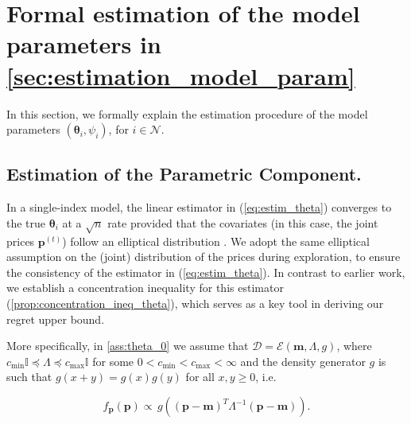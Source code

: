 \documentclass{article} %
\def\eqref#1{equation~\ref{#1}}
\renewcommand{\eqref}[1]{(\ref{#1})}
\begin{document}
\section{Formal estimation of the model parameters in \cref{sec:estimation_model_param}}\label{app:formal_estimation}
In this section, we formally explain the estimation procedure of the model parameters $(\boldsymbol{\theta}_i, \psi_i)$, for $i \in \mathcal{N}$. 


\subsection{Estimation of the Parametric Component.}\label{sec:estim_theta} 

In a single-index model, the linear estimator in \eqref{eq:estim_theta} converges to the true $\boldsymbol{\theta}_i$ at a $\sqrt{n}$ rate provided that the covariates (in this case, the joint prices $\mathbf{p}^{(t)}$) follow an elliptical distribution \citep{balabdaoui2019least, brillinger2012generalized}. We adopt the same elliptical assumption on the (joint) distribution of the prices during exploration, to ensure the consistency of the estimator in \eqref{eq:estim_theta}. In contrast to earlier work, we establish a concentration inequality for this estimator (\cref{prop:concentration_ineq_theta}), which serves as a key tool in deriving our regret upper bound.

More specifically, in \cref{ass:theta_0} we assume that $\mathscr{D}=\mathscr{E}(\mathbf{m},\Lambda, g)$, where $c_{\min} \mathbb{I}\preccurlyeq \Lambda \preccurlyeq c_{\max} \mathbb{I}$ for some $0<c_{\min}<c_{\max}<\infty$ and the density generator $g$ is such that $g(x+y)=g(x)g(y)$ for all $x,y \geq 0$, i.e.

\[
f_\mathbf{p}(\mathbf{p}) \propto \,g((\mathbf{p}-\mathbf{m})^T\Lambda^{-1}(\mathbf{p}-\mathbf{m})).
\]
\end{document}
